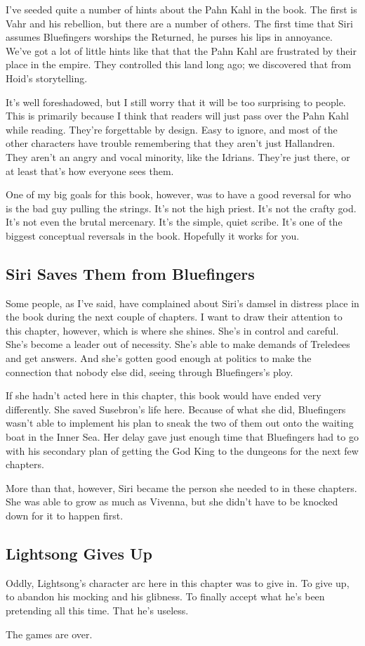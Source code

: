 I’ve seeded quite a number of hints about the Pahn Kahl in the book. The first is Vahr and his rebellion, but there are a number of others. The first time that Siri assumes Bluefingers worships the Returned, he purses his lips in annoyance. We’ve got a lot of little hints like that that the Pahn Kahl are frustrated by their place in the empire. They controlled this land long ago; we discovered that from Hoid’s storytelling.

It’s well foreshadowed, but I still worry that it will be too surprising to people. This is primarily because I think that readers will just pass over the Pahn Kahl while reading. They’re forgettable by design. Easy to ignore, and most of the other characters have trouble remembering that they aren’t just Hallandren. They aren’t an angry and vocal minority, like the Idrians. They’re just there, or at least that’s how everyone sees them.

One of my big goals for this book, however, was to have a good reversal for who is the bad guy pulling the strings. It’s not the high priest. It’s not the crafty god. It’s not even the brutal mercenary. It’s the simple, quiet scribe. It’s one of the biggest conceptual reversals in the book. Hopefully it works for you.

\subsection*{Siri Saves Them from Bluefingers}

Some people, as I’ve said, have complained about Siri’s damsel in distress place in the book during the next couple of chapters. I want to draw their attention to this chapter, however, which is where she shines. She’s in control and careful. She’s become a leader out of necessity. She’s able to make demands of Treledees and get answers. And she’s gotten good enough at politics to make the connection that nobody else did, seeing through Bluefingers’s ploy.

If she hadn’t acted here in this chapter, this book would have ended very differently. She saved Susebron’s life here. Because of what she did, Bluefingers wasn’t able to implement his plan to sneak the two of them out onto the waiting boat in the Inner Sea. Her delay gave just enough time that Bluefingers had to go with his secondary plan of getting the God King to the dungeons for the next few chapters.

More than that, however, Siri became the person she needed to in these chapters. She was able to grow as much as Vivenna, but she didn’t have to be knocked down for it to happen first.

\subsection*{Lightsong Gives Up}

Oddly, Lightsong’s character arc here in this chapter was to give in. To give up, to abandon his mocking and his glibness. To finally accept what he’s been pretending all this time. That he’s useless.

The games are over.



